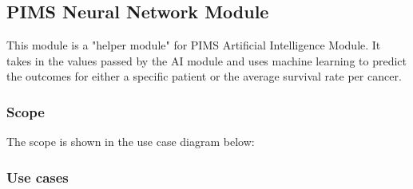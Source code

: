 \subsection{PIMS Neural Network Module}
This module is a "helper module" for PIMS Artificial Intelligence Module. It takes in the values passed by the AI module and uses machine learning to predict the outcomes for either a specific patient or the average survival rate per cancer. \par 

\subsubsection{Scope}
The scope is shown in the use case diagram below: \par

\subsubsection{Use cases}

	